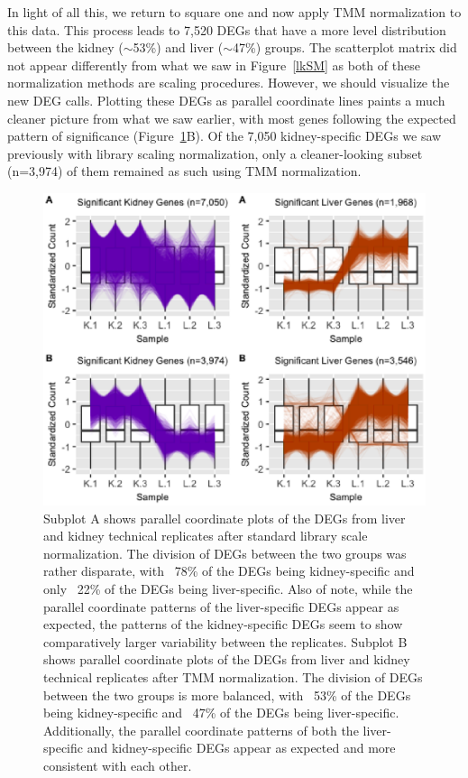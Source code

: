 \documentclass{bioinfo}
\begin{document}
In light of all this, we return to square one and now apply TMM normalization to this data. This process leads to 7,520 DEGs that have a more level distribution between the kidney ($\sim$53\%) and liver ($\sim$47\%) groups. The scatterplot matrix did not appear differently from what we saw in Figure~\ref{lkSM} as both of these normalization methods are scaling procedures. However, we should visualize the new DEG calls. Plotting these DEGs as parallel coordinate lines paints a much cleaner picture from what we saw earlier, with most genes following the expected pattern of significance (Figure~\ref{lkClusters}B). Of the 7,050 kidney-specific DEGs we saw previously with library scaling normalization, only a cleaner-looking subset (n=3,974) of them remained as such using TMM normalization.

\begin{figure}
\includegraphics[width=1\linewidth]{lkClusters.eps}
\caption{Subplot A shows parallel coordinate plots of the DEGs from liver and kidney technical replicates \citep{Marioni} after standard library scale normalization. The division of DEGs between the two groups was rather disparate, with ~78\% of the DEGs being kidney-specific and only ~22\% of the DEGs being liver-specific. Also of note, while the parallel coordinate patterns of the liver-specific DEGs appear as expected, the patterns of the kidney-specific DEGs seem to show comparatively larger variability between the replicates. Subplot B shows parallel coordinate plots of the DEGs from liver and kidney technical replicates after TMM normalization. The division of DEGs between the two groups is more balanced, with ~53\% of the DEGs being kidney-specific and ~47\% of the DEGs being liver-specific. Additionally, the parallel coordinate patterns of both the liver-specific and kidney-specific DEGs appear as expected and more consistent with each other.
\label{lkClusters}}
\end{figure}
\end{document}
